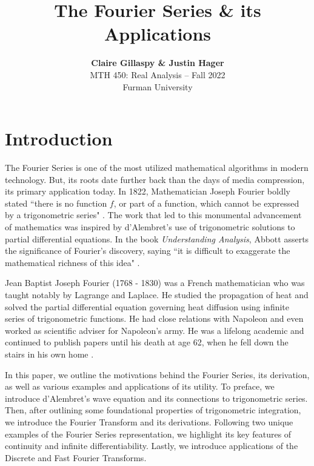 \documentclass[11pt]{amsart}
\theoremstyle{plain}
\theoremstyle{definition}
\begin{document}
\title{\vspace{-5ex}\textbf{The Fourier Series \& its Applications}}
\author{\textbf{Claire Gillaspy \& Justin Hager}\\MTH 450: Real Analysis -- Fall 2022\\Furman University}
\date{}

\maketitle
\thispagestyle{empty}
\section{Introduction}
The Fourier Series is one of the most utilized mathematical algorithms in modern technology. But, its roots date further back than the days of media compression, its primary application today. In 1822, Mathematician Joseph Fourier boldly stated ``there is no function $f$, or part of a function, which cannot be expressed by a trigonometric series" \cite{Fourier}. The work that led to this monumental advancement of mathematics was inspired by d'Alembret's use of trigonometric solutions to partial differential equations. In the book \textit{Understanding Analysis}, Abbott asserts the significance of Fourier's discovery, saying ``it is difficult to exaggerate the mathematical richness of this idea" \cite{Abbott}. 

Jean Baptist Joseph Fourier (1768 - 1830) was a French mathematician who was taught notably by Lagrange and Laplace. He studied the propagation of heat and solved the partial differential equation governing heat diffusion using infinite series of trigonometric functions. He had close relations with Napoleon and even worked as scientific adviser for Napoleon's army. He was a lifelong academic and continued to publish papers until his death at age 62, when he fell down the stairs in his own home \cite{Biography}.

In this paper, we outline the motivations behind the Fourier Series, its derivation, as well as various examples and applications of its utility. To preface, we introduce d'Alembret's wave equation and its connections to trigonometric series. Then, after outlining some foundational properties of trigonometric integration, we introduce the Fourier Transform and its derivations. Following two unique examples of the Fourier Series representation, we highlight its key features of continuity and infinite differentiability. Lastly, we introduce applications of the Discrete and Fast Fourier Transforms.
\end{document}
